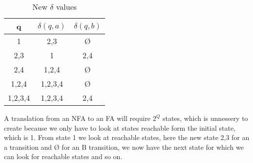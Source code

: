 \documentclass{article}
\begin{document}
\begin{table}[h]
\centering
\begin{tabular}{c|c c}
    q & $ \delta (q,a) $ & $ \delta (q,b) $ \\
        \hline
    1 & 2,3 & Ø \\
    2,3 & 1 & 2,4 \\
    2,4 & 1,2,4 & Ø\\
    1,2,4 & 1,2,3,4 & Ø \\
    1,2,3,4 & 1,2,3,4 & 2,4 \\
\end{tabular}
\caption{New $ \delta $ values}
\label{tab:FA-translation}
\end{table}
A translation from an NFA to an FA will require $ 2^Q $ states, which is unnessery to create because we only have to look at states reachable form the initial state, which is 1. From state 1 we look at reachable states, here the new state 2,3 for an a transition and Ø for an B transition, we now have the next state for which we can look for reachable states and so on.
    
\end{document}
